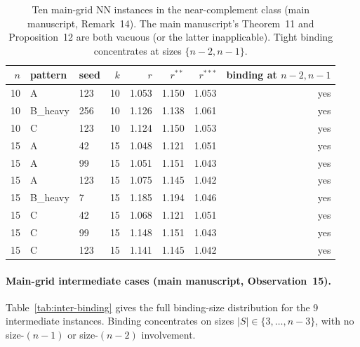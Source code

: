 \documentclass[11pt]{article}
\begin{document}
\begin{table}[htbp]
\centering
\footnotesize
\caption{Ten main-grid NN instances in the near-complement class (main manuscript, Remark~14). The main manuscript's Theorem~11 and Proposition~12 are both vacuous (or the latter inapplicable). Tight binding concentrates at sizes $\{n-2, n-1\}$.}
\label{tab:near-main}
\begin{tabular}{@{}rllrrrrr@{}}
\toprule
$n$ & pattern & seed & $k$ & $r$ & $r^{\ast\ast}$ & $r^{\ast\ast\ast}$ & binding at $n-2, n-1$ \\
\midrule
10 & A        & 123 & 10 & 1.053 & 1.150 & 1.053 & yes \\
10 & B\_heavy & 256 & 10 & 1.126 & 1.138 & 1.061 & yes \\
10 & C        & 123 & 10 & 1.124 & 1.150 & 1.053 & yes \\
15 & A        &  42 & 15 & 1.048 & 1.121 & 1.051 & yes \\
15 & A        &  99 & 15 & 1.051 & 1.151 & 1.043 & yes \\
15 & A        & 123 & 15 & 1.075 & 1.145 & 1.042 & yes \\
15 & B\_heavy &   7 & 15 & 1.185 & 1.194 & 1.046 & yes \\
15 & C        &  42 & 15 & 1.068 & 1.121 & 1.051 & yes \\
15 & C        &  99 & 15 & 1.148 & 1.151 & 1.043 & yes \\
15 & C        & 123 & 15 & 1.141 & 1.145 & 1.042 & yes \\
\bottomrule
\end{tabular}
\end{table}

\paragraph{Main-grid intermediate cases (main manuscript, Observation~15).} Table~\ref{tab:inter-binding} gives the full binding-size distribution for the 9 intermediate instances. Binding concentrates on sizes $|S|\in\{3,\ldots,n-3\}$, with no size-$(n-1)$ or size-$(n-2)$ involvement.
\end{document}

